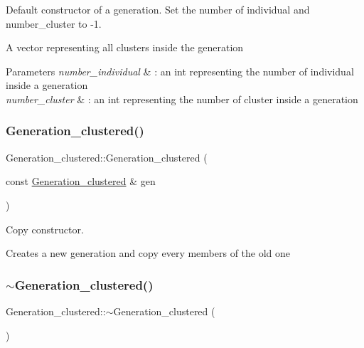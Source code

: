 Default constructor of a generation. Set the number of individual and number\+\_\+cluster to -\/1. 

A vector representing all clusters inside the generation


\begin{DoxyParams}{Parameters}
{\em number\+\_\+individual} & \+: an int representing the number of individual inside a generation \\
\hline
{\em number\+\_\+cluster} & \+: an int representing the number of cluster inside a generation \\
\hline
\end{DoxyParams}
\mbox{\label{class_generation__clustered_aaa729c31844ef335a192656e58f2337c}} 
\subsubsection{\texorpdfstring{Generation\+\_\+clustered()}{Generation\_clustered()}\hspace{0.1cm}{\footnotesize\ttfamily [2/2]}}
{\footnotesize\ttfamily Generation\+\_\+clustered\+::\+Generation\+\_\+clustered (\begin{DoxyParamCaption}\item[{const \hyperlink{class_generation__clustered}{Generation\+\_\+clustered} \&}]{gen }\end{DoxyParamCaption})}



Copy constructor. 

Creates a new generation and copy every members of the old one \mbox{\label{class_generation__clustered_aeb063106dd0dbfd237108e26f3439101}} 
\subsubsection{\texorpdfstring{$\sim$\+Generation\+\_\+clustered()}{~Generation\_clustered()}}
{\footnotesize\ttfamily Generation\+\_\+clustered\+::$\sim$\+Generation\+\_\+clustered (\begin{DoxyParamCaption}{ }\end{DoxyParamCaption})}



